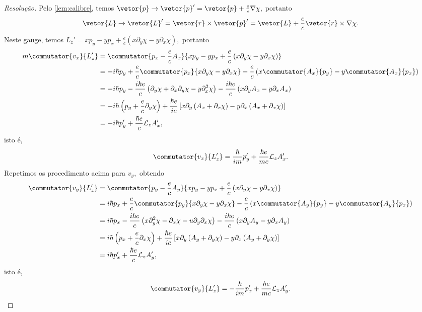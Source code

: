\begin{proof}[Resolução]
   Pelo \cref{lem:calibre}, temos \(\vetor{p} \to \vetor{p}' = \vetor{p} + \frac{e}{c} \nabla \chi,\) portanto
   \begin{equation*}
      \vetor{L} \to \vetor{L}' = \vetor{r} \times \vetor{p}' = \vetor{L} + \frac{e}{c} \vetor{r} \times \nabla \chi.
   \end{equation*}
   Neste gauge, temos \(L_z' = x p_y - y p_x + \frac{e}{c} \left(x \partial_y \chi - y \partial_x \chi\right),\) portanto
   \begin{align*}
      m\commutator{v_x}{L_z'} &= \commutator{p_x - \frac{e}{c} A_x}{x p_y - y p_x + \frac{e}{c} \left(x \partial_y \chi - y \partial_x \chi\right)}\\
                              &= -i \hbar p_y + \frac{e}{c}\commutator{p_x}{x \partial_y \chi -  y \partial_x \chi} - \frac{e}{c} \left(x\commutator{A_x}{p_y} - y \commutator{A_x}{p_x}\right)\\
                              &= -i \hbar p_y - \frac{i \hbar e}{c} \left(\partial_y \chi + \partial_x \partial_y \chi - y \partial_x^2 \chi\right) - \frac{i \hbar e}{c}\left(x \partial_y A_x - y \partial_x A_x\right)\\
                              &= -i \hbar\left(p_y + \frac{e}{c} \partial_y \chi\right) + \frac{\hbar e}{ic} \left[x\partial_y \left(A_x  + \partial_x \chi\right) - y \partial_x \left(A_x + \partial_x \chi\right)\right]\\
                              &= -i \hbar p_y' + \frac{\hbar e}{c} \mathcal{L}_z A_x',
   \end{align*}
   isto é,
   \begin{equation*}
      \commutator{v_x}{L_z'} = \frac{\hbar}{i m} p_y' + \frac{\hbar e}{m c} \mathcal{L}_z A_x'.
   \end{equation*}
   Repetimos os procedimento acima para \(v_y,\) obtendo
   \begin{align*}
      \commutator{v_y}{L_z'} &= \commutator{p_y - \frac{e}{c} A_y}{x p_y - y p_x + \frac{e}{c} \left(x \partial_y \chi - y \partial_x \chi\right)}\\
                              &= i \hbar p_x + \frac{e}{c}\commutator{p_y}{x \partial_y \chi -  y \partial_x \chi} - \frac{e}{c} \left(x\commutator{A_y}{p_y} - y \commutator{A_y}{p_x}\right)\\
                              &= i \hbar p_x - \frac{i \hbar e}{c} \left(x\partial_y^2 \chi - \partial_x \chi - u \partial_y \partial_x \chi\right) - \frac{i \hbar e}{c}\left(x \partial_y A_y - y \partial_x A_y\right)\\
                              &= i \hbar\left(p_x + \frac{e}{c} \partial_x \chi\right) + \frac{\hbar e}{ic} \left[x\partial_y \left(A_y  + \partial_y \chi\right) - y \partial_x \left(A_y + \partial_y \chi\right)\right]\\
                              &= i \hbar p_x' + \frac{\hbar e}{c} \mathcal{L}_z A_y',
   \end{align*}
   isto é,
   \begin{equation*}
      \commutator{v_y}{L_z'} = -\frac{\hbar}{i m} p_x' + \frac{\hbar e}{m c} \mathcal{L}_z A_y'.
   \end{equation*}


\end{proof}

